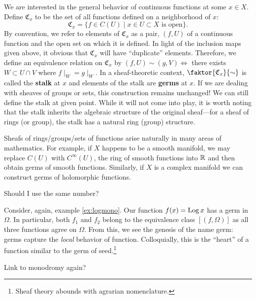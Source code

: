 We are interested in the general behavior of continuous functions at some
\(x \in X\). Define \(\mathfrak{C}_x\) to be the set of all functions defined on a
neighborhood of \(x\):
\[
  \mathfrak{C}_x = \{f \in C(U) \mid x \in U \subset X \text{ is open}\}.
\]
By convention, we refer to elements of \(\mathfrak{C}_x\) as a pair, \((f,U)\) of
a continuous function and the open set on which it is defined.
In light of the inclusion maps given above, it obvious that \(\mathfrak{C}_x\)
will have ``duplicate'' elements. Therefore, we define an equivalence relation
on \(\mathfrak{C}_x\) by \((f,U) \sim (g,V) \Leftrightarrow\) there exists
\(W \subset U \cap V\) where \(f \mid _W = g\mid _W\). In a sheaf-theoretic
context, \(\faktor{\mathfrak{C}_x}{\sim} \) is called the \textbf{stalk} at \(x\)
and elements of the stalk are \textbf{germs} at \(x\). If we are dealing with
sheaves of groups or sets, this construction remains unchanged! We can still
define the stalk at given point. While it will not come into play, it is worth
noting that the stalk inherits the algebraic structure of the original
sheaf---\eg for a sheaf of rings (or group), the stalk has a natural ring
(group) structure.

Sheafs of rings/groups/sets of functions arise naturally in many areas of
mathematics. For example, if \(X\) happens to be a smooth manifold, we may
replace \(C(U)\) with \(C^\infty(U)\), the ring of smooth functions into
\(\mathbb{R} \) and then obtain germs of smooth functions.  Similarly, if \(X\) is a
complex manifold we can construct germs of holomorphic functions.

\begin{example}
{\color{red} Should I use the same number?}

Consider, again, example \ref{ex:logmono}. Our function \(f(x)= \operatorname{Log} x\) has
a germ in \(\Omega\). In particular, both \(f_1\) and \(f_2\) belong to the
equivalence class \([(f,\Omega)]\) as all three functions agree on \(\Omega\).
From this, we {\color{red} see the genesis of the name} germ: germs capture the
\emph{local} behavior of function. Colloquially, this is the ``heart'' of a
function similar to the germ of seed.\footnote{Sheaf theory abounds with
  agrarian nomenclature.}
\end{example}

{\color{red} Link to monodromy again?}

